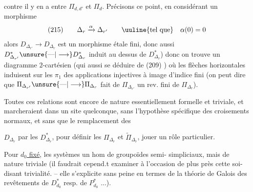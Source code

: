 contre il y en a entre $\Pi_{d,d'}$ et $\Pi_d$.
Précisons ce point, en considérant un
morphisme
\[
(215)\qquad\Delta_r\xrightarrow{\alpha}\Delta_{r'}\qquad\text{\uuline{tel que}}\quad\alpha(0)=0
\]
alors $D_{\Delta_{r'}}\longrightarrow D_{\Delta_r}$ est un morphisme
étale fini, donc aussi $D^*_{\Delta_{r'}}\unsure{\text{---}|\longrightarrow}D^*_{\Delta_r}$ induit
au dessus de $D^*_{\Delta_r}$) donc on trouve
un diagramme $2$-cartésien (qui  
 aussi se déduire de (209)
)
où les flèches horizontales induisent sur
les $\pi_1$ des applications injectives à
image d'indice fini (on peut dire que
$\Pi_{\Delta_{r'}}\unsure{\text{---}|\longrightarrow}\Pi_{\Delta_r}$ fait de $\Pi_{\Delta_{r'}}$ un
rev. fini de $\Pi_{\Delta_r}$).

Toutes ces relations sont encore de
nature essentiellement formelle et triviale,
et marcheraient dans un site quelconque,
sans l'hypothèse spécifique des croisements
normaux, et sans que le remplacement des

$D_{\Delta_r}$ par les $D^*_{\Delta_r}$, pour définir les
$\Pi_{\Delta_r}$ et $\widetilde\Pi_{\Delta_r}$, 
jouer un rôle particulier.

Pour \uline{$d_0$ fixé}, les systèmes
 un hom de groupoïdes semi-
simpliciaux, mais de nature 
triviale (il faudrait cepend.t examiner
à l'occasion de plus près cette soi-disant
trivialité. --  elle s'explicite sans peine
en termes de la théorie de Galois
des revêtements de $D^*_{d_0}$ resp. de $P^*_{d_0}$ ...).

